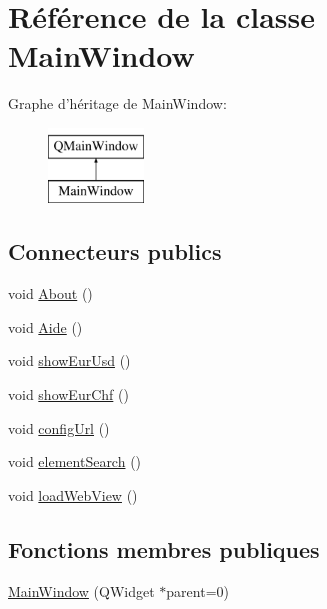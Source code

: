 \hypertarget{class_main_window}{\section{Référence de la classe Main\-Window}
\label{class_main_window}
}
Graphe d'héritage de Main\-Window\-:\begin{figure}[H]
\begin{center}
\leavevmode
\includegraphics[height=2.000000cm]{class_main_window}
\end{center}
\end{figure}
\subsection*{Connecteurs publics}
\begin{DoxyCompactItemize}
\item 
void \hyperlink{class_main_window_acb789dac6a35383ad1d7bb6f652c7cee}{About} ()
\item 
void \hyperlink{class_main_window_a60313e11853d62369dd7f48c36867733}{Aide} ()
\item 
void \hyperlink{class_main_window_af71514a6d74571f32a45fa79ddd7d291}{show\-Eur\-Usd} ()
\item 
void \hyperlink{class_main_window_a3350e0511efc29d592d876a7298123c7}{show\-Eur\-Chf} ()
\item 
void \hyperlink{class_main_window_a80a42469b3b6fc9548123fdcb9c400db}{config\-Url} ()
\item 
void \hyperlink{class_main_window_adddc34c97edbe78434e600cdb076ebc7}{element\-Search} ()
\item 
void \hyperlink{class_main_window_a479a75cb750744fa76646781b6a96f79}{load\-Web\-View} ()
\end{DoxyCompactItemize}
\subsection*{Fonctions membres publiques}
\begin{DoxyCompactItemize}
\item 
\hyperlink{class_main_window_a8b244be8b7b7db1b08de2a2acb9409db}{Main\-Window} (Q\-Widget $\ast$parent=0)
\end{DoxyCompactItemize}


